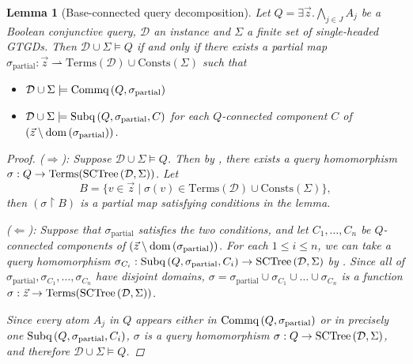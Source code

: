 \documentclass[12pt]{report}
\theoremstyle{plain}
\newtheorem{lemma}[theorem]{Lemma}
\theoremstyle{definition}
\def\Consts{{\mathrm{Consts}}}
\def\Terms{{\mathrm{Terms}}}
\newcommand{\dom}[1]{\ensuremath{\normalfont{\operatorname{dom}} \left( #1 \right)}}
\newcommand{\SCTree}[2]{\ensuremath{\normalfont{\textrm{SCTree}} \left( #1, #2 \right)}}
\newcommand{\Subq}[3]{\ensuremath{\normalfont{\textrm{Subq}} \left( #1, #2, #3 \right)}}
\newcommand{\Commq}[2]{\ensuremath{\normalfont{\textrm{Commq}} \left( #1, #2 \right)}}
\begin{document}
\begin{lemma}[Base-connected query decomposition]
\label{bcq-base-connected-query-decomposition}
  Let $Q = \exists \vec{z}. \bigwedge_{j \in J} A_j$ be a Boolean conjunctive query, $\mathcal{D}$ an instance and $\Sigma$ a finite set of single-headed GTGDs. Then $\mathcal{D} \cup \Sigma \models Q$ if and only if there exists a partial map $\sigma_{\mathrm{partial}}: \vec{z} \rightharpoonup \Terms(\mathcal{D}) \cup \Consts(\Sigma)$ such that
  \begin{itemize}
    \item $\mathcal{D} \cup \Sigma \models \Commq{Q}{\sigma_{\mathrm{partial}}}$
    \item $\mathcal{D} \cup \Sigma \models \Subq{Q}{\sigma_{\mathrm{partial}}}{C}$ for each $Q$-connected component $C$ of \newline $(\vec{z} \setminus\nobreak \mathrm{\dom{\sigma_{\mathrm{partial}}}})$.
  \end{itemize}
  \begin{proof}
    ($\Longrightarrow$): Suppose $\mathcal{D} \cup \Sigma \models Q$. Then by , there exists a query homomorphism $\sigma: Q \rightarrow \Terms(\SCTree{\mathcal{D}}{\Sigma})$. Let $$B = \{ v \in \vec{z} \mid \sigma(v) \in \Terms(\mathcal{D}) \cup \Consts(\Sigma) \},$$ then $(\sigma \upharpoonright B)$ is a partial map satisfying conditions in the lemma.

    ($\Longleftarrow$): Suppose that $\sigma_{\mathrm{partial}}$ satisfies the two conditions, and let $C_1, \ldots, C_n$ be $Q$-connected components of $(\vec{z} \setminus\nobreak \mathrm{\dom{\sigma_{\mathrm{partial}}}})$. For each $1 \leq i \leq n$, we can take a query homomorphism $\sigma_{C_i}: \Subq{Q}{\sigma_{\mathrm{partial}}}{C_i} \rightarrow \SCTree{\mathcal{D}}{\Sigma}$ by . Since all of $\sigma_{\mathrm{partial}}, \sigma_{C_1}, \ldots, \sigma_{C_n}$ have disjoint domains, $\sigma = \sigma_{\mathrm{partial}} \cup \sigma_{C_1} \cup \ldots \cup \sigma_{C_n}$ is a function $\sigma: \vec{z} \rightarrow \Terms(\SCTree{\mathcal{D}}{\Sigma})$.
    
    Since every atom $A_j$ in $Q$ appears either in $\Commq{Q}{\sigma_{\mathrm{partial}}}$ or in precisely one $\Subq{Q}{\sigma_{\mathrm{partial}}}{C_i}$, $\sigma$ is a query homomorphism $\sigma: Q \rightarrow \SCTree{\mathcal{D}}{\Sigma}$, and therefore $\mathcal{D} \cup \Sigma \models Q$.
  \end{proof}
\end{lemma}
\end{document}
